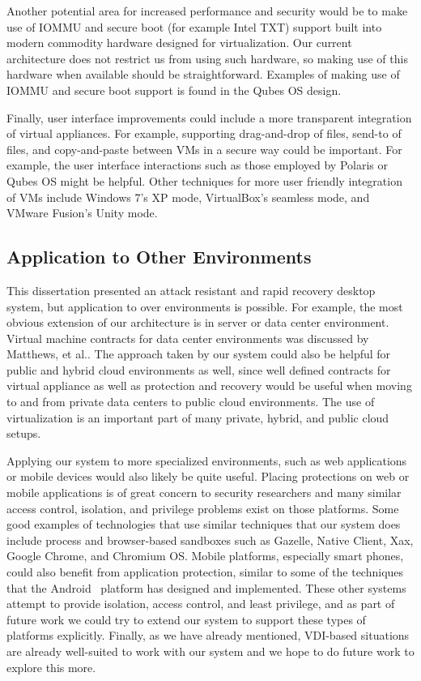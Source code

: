 Another potential area for increased performance and security would be to make use of IOMMU and secure boot (for example Intel TXT) support built into modern commodity hardware designed for virtualization. Our current architecture does not restrict us from using such hardware, so making use of this hardware when available should be straightforward. Examples of making use of IOMMU and secure boot support is found in the Qubes OS design. 

Finally, user interface improvements could include a more transparent integration of virtual appliances. For example, supporting drag-and-drop of files, send-to of files, and copy-and-paste between VMs in a secure way could be important. For example, the user interface interactions such as those employed by Polaris\cite{stiegler_2006} or Qubes OS might be helpful. Other techniques for more user friendly integration of VMs include Windows 7's XP mode, VirtualBox's seamless mode, and VMware Fusion's Unity mode.

\subsection{Application to Other Environments}
\label{sec:fw-other-environments}

This dissertation presented an attack resistant and rapid recovery desktop system, but application to over environments is possible. For example, the most obvious extension of our architecture is in server or data center environment. Virtual machine contracts for data center environments was discussed by Matthews, et al.\cite{virtual_machine_contract_ICAC09}. The approach taken by our system could also be helpful for public and hybrid cloud environments as well, since well defined contracts for virtual appliance as well as protection and recovery would be useful when moving to and from private data centers to public cloud environments. The use of virtualization is an important part of many private, hybrid, and public cloud setups.

Applying our system to more specialized environments, such as web applications or mobile devices would also likely be quite useful. Placing protections on web or mobile applications is of great concern to security researchers and many similar access control, isolation, and privilege problems exist on those platforms. Some good examples of technologies that use similar techniques that our system does include process and browser-based sandboxes such as Gazelle\cite{grier_gazelle_2009}, Native Client\cite{yee_nacl_2009}, Xax\cite{douceur_xax_2008}, Google Chrome\cite{reis_2009}, and Chromium OS\cite{chromium_os_security_overview_website}. Mobile platforms, especially smart phones, could also benefit from application protection, similar to some of the techniques that the Android~\cite{canning_android_keynote_2009,android_security_dev} platform has designed and implemented. These other systems attempt to provide isolation, access control, and least privilege, and as part of future work we could try to extend our system to support these types of platforms explicitly. Finally, as we have already mentioned, VDI-based situations are already well-suited to work with our system and we hope to do future work to explore this more.

